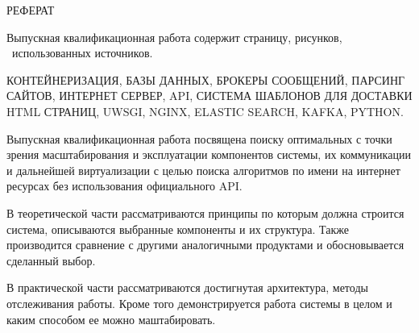 \begin{center}
РЕФЕРАТ
\end{center}









Выпускная квалификационная работа содержит \pageref{LastPage} страницу, \totfig{}
рисунков, \ использованных источников.

КОНТЕЙНЕРИЗАЦИЯ, БАЗЫ ДАННЫХ, БРОКЕРЫ СООБЩЕНИЙ, ПАРСИНГ САЙТОВ, ИНТЕРНЕТ
СЕРВЕР, API, СИСТЕМА ШАБЛОНОВ ДЛЯ ДОСТАВКИ HTML СТРАНИЦ, UWSGI, NGINX, ELASTIC
SEARCH, KAFKA, PYTHON.

Выпускная квалификационная работа посвящена поиску оптимальных с точки зрения
масштабирования и эксплуатации компонентов системы, их коммуникации и дальнейшей
виртуализации с целью поиска алгоритмов по имени на интернет ресурсах без
использования официального API.

В теоретической части рассматриваются принципы по которым должна строится
система, описываются выбранные компоненты и их структура. Также производится
сравнение с другими аналогичными продуктами и обосновывается сделанный выбор.

В практической части рассматриваются достигнутая архитектура, методы
отслеживания работы. Кроме того демонстрируется работа системы в целом и каким
способом ее можно маштабировать.
